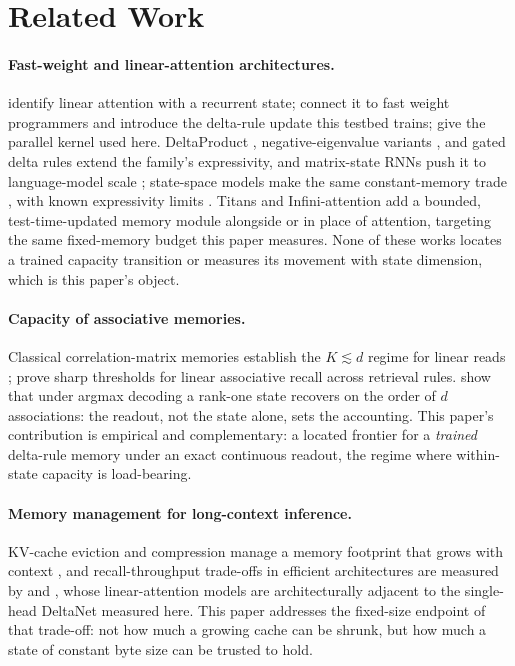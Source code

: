 \section{Related Work}
\label{sec:related}

\paragraph{Fast-weight and linear-attention architectures.}
\citet{katharopoulos2020linear} identify linear attention with a
recurrent state; \citet{schlag2021linear} connect it to fast weight
programmers and introduce the delta-rule update this testbed trains;
\citet{yang2024deltanet} give the parallel kernel used here. DeltaProduct
\citep{siems2025deltaproduct}, negative-eigenvalue variants
\citep{grazzi2025negative}, and gated delta rules
\citep{yang2024gateddelta} extend the family's expressivity, and
matrix-state RNNs push it to language-model scale \citep{mishra2026m2rnn};
state-space models make the same constant-memory trade
\citep{gu2023mamba}, with known expressivity limits
\citep{merrill2024illusion}. Titans \citep{behrouz2025titans} and
Infini-attention \citep{munkhdalai2024infiniattention} add a bounded,
test-time-updated memory module alongside or in place of attention,
targeting the same fixed-memory budget this paper measures. None of
these works locates a trained capacity transition or measures its
movement with state dimension, which is this paper's object.

\paragraph{Capacity of associative memories.} Classical correlation-matrix
memories establish the $K \lesssim d$ regime for linear reads
\citep{kohonen1972correlation, anderson1972simple};
\citet{barnfield2026sharp} prove sharp thresholds for linear associative
recall across retrieval rules. \citet{nichani2025factual} show that under
argmax decoding a rank-one state recovers on the order of $d$
associations: the readout, not the state alone, sets the accounting. This
paper's contribution is empirical and complementary: a located frontier
for a \emph{trained} delta-rule memory under an exact continuous readout,
the regime where within-state capacity is load-bearing.

\paragraph{Memory management for long-context inference.} KV-cache
eviction and compression manage a memory footprint that grows with
context \citep{xiao2024streamingllm, zhang2023h2o}, and recall-throughput
trade-offs in efficient architectures are measured by
\citet{arora2023zoology} and \citet{arora2024based}, whose
linear-attention models are architecturally adjacent to the single-head
DeltaNet measured here. This paper addresses the fixed-size endpoint of
that trade-off: not how much a growing cache can be shrunk, but how much
a state of constant byte size can be trusted to hold.

